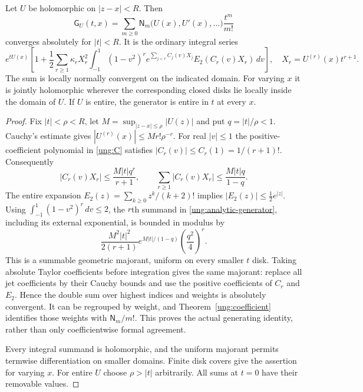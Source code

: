 \begin{theorem}
\label{ung:analytic}
Let $U$ be holomorphic on $|z-x|<R$. Then
\[
 \mathsf G_U(t,x)=\sum_{m\ge0}
       \mathsf N_m\bigl(U(x),U'(x),\ldots\bigr)\frac{t^m}{m!}
\]
converges absolutely for $|t|<R$. It is the ordinary integral series
\begin{equation}\label{ung:analytic-generator}
 \boxed{\displaystyle
 e^{tU(x)}\left[1+\frac12\sum_{r\ge1}\kappa_rX_r^2
 \int_{-1}^1(1-v^2)^r
       e^{\sum_{j<r}C_j(v)X_j}E_2(C_r(v)X_r)\,dv\right],
 \quad X_r=U^{(r)}(x)t^{r+1}.}
\end{equation}
The sum is locally normally convergent on the indicated domain.
For varying $x$ it is jointly holomorphic wherever the corresponding
closed disks lie locally inside the domain of $U$.
If $U$ is entire, the generator is entire in $t$ at every $x$.
\end{theorem}

\begin{proof}
Fix $|t|<\rho<R$, let $M=\sup_{|z-x|\le\rho}|U(z)|$ and put
$q=|t|/\rho<1$. Cauchy's estimate gives
$|U^{(r)}(x)|\le Mr!\rho^{-r}$.
For real $|v|\le1$ the positive-coefficient polynomial in
\eqref{ung:C} satisfies $|C_r(v)|\le C_r(1)=1/(r+1)!$.
Consequently
\[
 |C_r(v)X_r|\le\frac{M|t|q^r}{r+1},\qquad
 \sum_{r\ge1}|C_r(v)X_r|\le\frac{M|t|q}{1-q}.
\]
The entire expansion $E_2(z)=\sum_{k\ge0}z^k/(k+2)!$ implies
$|E_2(z)|\le\tfrac12e^{|z|}$.
Using $\int_{-1}^1(1-v^2)^r\,dv\le2$, the $r$th summand in
\eqref{ung:analytic-generator}, including its external exponential,
is bounded in modulus by
\begin{equation}\label{ung:majorant}
 \frac{M^2|t|^2}{2(r+1)}
       e^{M|t|/(1-q)}\left(\frac{q^2}{4}\right)^r.
\end{equation}
This is a summable geometric majorant, uniform on every smaller
$t$ disk. Taking absolute Taylor coefficients before integration
gives the same majorant: replace all jet coefficients by their
Cauchy bounds and use the positive coefficients of $C_r$ and $E_2$.
Hence the double sum over highest indices and weights is absolutely
convergent. It can be regrouped by weight, and
Theorem~\ref{ung:coefficient} identifies those weights with
$\mathsf N_m/m!$. This proves the actual generating identity, rather
than only coefficientwise formal agreement.

Every integral summand is holomorphic, and the uniform majorant
permits termwise differentiation on smaller domains. Finite disk
covers give the assertion for varying $x$. For entire $U$ choose
$\rho>|t|$ arbitrarily. All sums at $t=0$ have their removable values.
\end{proof}

